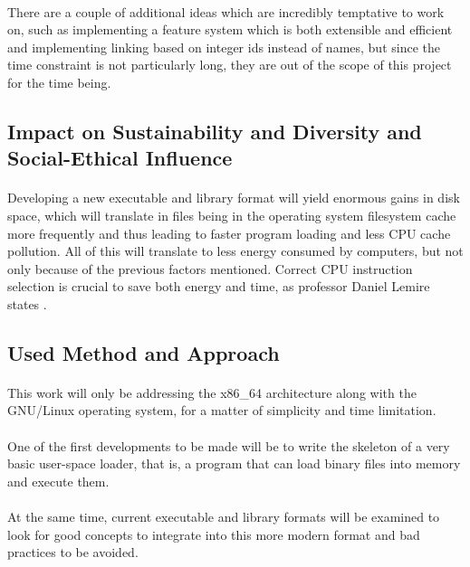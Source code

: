 \documentclass[12pt]{article}
\begin{document}
	\paragraph{} There are a couple of additional ideas which are incredibly temptative to work on, such as implementing a feature system which is both extensible and efficient and implementing linking based on integer ids instead of names, but since the time constraint is not particularly long, they are out of the scope of this project for the time being.
	\subsection{Impact on Sustainability and Diversity and Social-Ethical Influence}
    \paragraph{} Developing a new executable and library format will yield enormous gains in disk space, which will translate in files being in the operating system filesystem cache more frequently and thus leading to faster program loading and less CPU cache pollution. All of this will translate to less energy consumed by computers, but not only because of the previous factors mentioned. Correct CPU instruction selection is crucial to save both energy and time, as professor Daniel Lemire states \cite{lemire-energy}. 
	\subsection{Used Method and Approach}
	\paragraph{}This work will only be addressing the x86\_64 architecture along with the GNU/Linux operating system, for a matter of simplicity and time limitation.
    
    \paragraph{}One of the first developments to be made will be to write the skeleton of a very basic user-space loader, that is, a program that can load binary files into memory and execute them.
    
    \paragraph{}At the same time, current executable and library formats will be examined to look for good concepts to integrate into this more modern format and bad practices to be avoided.
    
\end{document}
